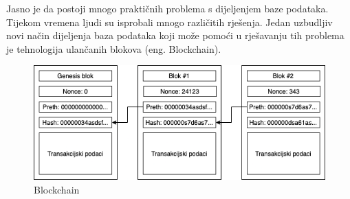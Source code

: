 \documentclass[times, utf8, diplomski]{fer}
\begin{document}
Jasno je da postoji mnogo praktičnih problema s dijeljenjem baze podataka. Tijekom vremena ljudi su isprobali mnogo različitih rješenja. Jedan uzbudljiv novi način dijeljenja baza podataka koji može pomoći u rješavanju tih problema je tehnologija ulančanih blokova (eng. Blockchain). 

\begin{figure}[htb]
\centering
\includegraphics[width=12cm]{imgs/Blockchain.png}
\caption{Blockchain}
\label{fig:blockchain}
\end{figure}
\end{document}
